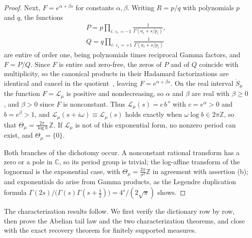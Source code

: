 \documentclass[sn-mathphys-num]{sn-jnl}
\theoremstyle{thmstyleone}%
\theoremstyle{thmstyletwo}%
\theoremstyle{thmstylethree}%
\theoremstyle{thmstyleone}%
\providecommand{\C}{\mathbb{C}}
\providecommand{\Z}{\mathbb{Z}}
\providecommand{\Leh}{\mathscr{L}}
\begin{document}
\begin{appendices}
\begin{proof}
			Next, $F=e^{\alpha+\beta s}$ for constants
			$\alpha,\beta$. Writing $R=p/q$ with polynomials $p$ and
			$q$, the functions
			\begin{equation}\label{eq:PQentire}
				\begin{gathered}
					P=p\prod_{i:\,\varepsilon_i=-1}
					\frac1{\Gamma(a_i+s/p_i)},\\
					Q=q\prod_{i:\,\varepsilon_i=+1}
					\frac1{\Gamma(a_i+s/p_i)}
				\end{gathered}
			\end{equation}
			are entire of order one, being polynomials times reciprocal
			Gamma factors, and $F=P/Q$. Since $F$ is entire and
			zero-free, the zeros of $P$ and of $Q$ coincide with
			multiplicity, so the canonical products in their Hadamard
			factorizations are identical and cancel in the
			quotient~\cite{boas1954}, leaving $F=e^{\alpha+\beta s}$.
			On the real interval $\mathring S_\mu$ the function
			$F=\Leh_\mu$ is positive and nondecreasing, so $\alpha$
			and $\beta$ are real with $\beta\ge0$, and $\beta>0$
			since $F$ is nonconstant. Thus
			$\Leh_\mu(s)=c\,b^{\,s}$ with $c=e^{\alpha}>0$ and
			$b=e^{\beta}>1$, and
			$\Leh_\mu(s+i\omega)\equiv\Leh_\mu(s)$ holds exactly
			when $\omega\log b\in2\pi\Z$, so that
			$\Theta_\mu=\tfrac{2\pi}{\log b}\,\Z$. If $\Leh_\mu$
			is not of this exponential form, no nonzero period can
			exist, and $\Theta_\mu=\{0\}$.
			
			Both branches of the dichotomy occur. A nonconstant rational
			transform has a zero or a pole in $\C$, so its period group
			is trivial; the log-affine transform of the lognormal is the
			exponential case, with
			$\Theta_\mu=\tfrac{2\pi}{\sigma^2}\Z$ in agreement
			with assertion (b); and exponentials do arise from Gamma
			products, as the Legendre duplication formula
			$\Gamma(2s)/\bigl(\Gamma(s)\Gamma(s+\tfrac12)\bigr)
			=4^{s}/(2\sqrt\pi)$ shows.
		\end{proof}
		
		The characterization results follow. We first verify the
		dictionary row by row, then prove the Abelian tail law and the
		two characterization theorems, and close with the exact recovery
		theorem for finitely supported measures.
		\proptwosources*
		

\end{appendices}
\end{document}

